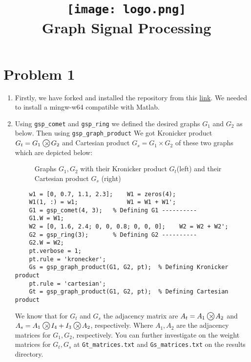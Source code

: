 \documentclass{article}
\title{
    \texttt{[image: logo.png]} \\ %
    Graph Signal Processing \par \exerciseset
}
\author{\SecondAuther }
\newcommand{\circledtimes}{\mathbin{\text{\large$\bigcirc$}\kern-0.9em\times}}
\begin{document}
\maketitle
\section*{Problem 1}
\begin{enumerate}
    \item Firstly, we have forked and installed the repository from this \href{https://epfl-lts2.github.io/gspbox-html/download.html}{link}. We needed to install a mingw-w64 compatible with Matlab.
    \item Using \texttt{gsp\_comet} and \texttt{gsp\_ring} we defined the desired graphs $G_1$ and $G_2$ as below. Then using \texttt{gsp\_graph\_product} We got Kronicker product $G_t = G_1 \circledtimes G_2$  and Cartesian product $G_s = G_1 \times G_2$  of these two graphs which are depicted below:
    \begin{figure}[h!]
        \centering
        \hfill
        \caption{Graphs $G_1 , G_2$ with their Kronicker product $G_t$(left) and their Cartesian product $G_s$ (right) }
        \label{fig:graphs}
    \end{figure}
    
    \begin{lstlisting}
    w1 = [0, 0.7, 1.1, 2.3];    W1 = zeros(4);
    W1(1, :) = w1;              W1 = W1 + W1';
    G1 = gsp_comet(4, 3);   % Defining G1 ----------
    G1.W = W1;
    W2 = [0, 1.6, 2.4; 0, 0, 0.8; 0, 0, 0];    W2 = W2 + W2';
    G2 = gsp_ring(3);       % Defining G2 ----------
    G2.W = W2;
    pt.verbose = 1;
    pt.rule = 'kronecker';
    Gs = gsp_graph_product(G1, G2, pt);  % Defining Kronicker product
    pt.rule = 'cartesian';
    Gt = gsp_graph_product(G1, G2, pt);  % Defining Cartesian product
    \end{lstlisting}
    
    We know that for $G_t$ and $G_s$ the adjacency matrix are $A_t= A_1 \circledtimes A_2$ and $A_s = A_1 \circledtimes I_4 + I_3 \circledtimes A_2$, respectively. Where $A_1, A_2$ are the adjacency matrices for $G_1, G_2$, respectively. You can further investigate on the weight matrices for $G_t, G_s$ at 
    \texttt{Gt\_matrices.txt} and \texttt{Gs\_matrices.txt} on the results directory.
    

\end{enumerate}
\end{document}

